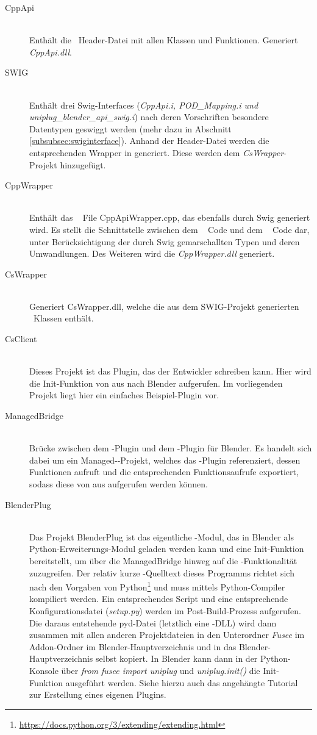 \begin{description}
\item[CppApi]\hfill \\
Enthält die \CC~Header-Datei mit allen Klassen und Funktionen. Generiert \emph{CppApi.dll}.
\item[SWIG]\hfill \\
Enthält drei Swig-Interfaces (\emph{CppApi.i, POD\_Mapping.i und \\
uniplug\_blender\_api\_swig.i}) nach deren Vorschriften besondere Datentypen geswiggt werden (mehr dazu in Abschnitt \ref{subsubsec:swiginterface}). Anhand der Header-Datei werden die entsprechenden Wrapper in \CS generiert. Diese werden dem \emph{CsWrapper}-Projekt hinzugefügt.
\item[CppWrapper]\hfill \\
Enthält das \CC~ File CppApiWrapper.cpp, das ebenfalls durch Swig generiert wird. Es stellt die Schnittstelle zwischen dem \CC~ Code und dem \CS~ Code dar, unter Berücksichtigung der durch Swig gemarschallten Typen und deren Umwandlungen. Des Weiteren wird die \emph{CppWrapper.dll} generiert.
\item[CsWrapper]\hfill \\
Generiert CsWrapper.dll, welche die aus dem SWIG-Projekt generierten \CS~Klassen enthält. 
\item[CsClient]\hfill \\
Dieses Projekt ist das Plugin, das der Entwickler schreiben kann. Hier wird die Init-Funktion von \CS aus nach Blender aufgerufen. Im vorliegenden Projekt liegt hier ein einfaches Beispiel-Plugin vor.
\item[ManagedBridge]\hfill \\ 
Brücke zwischen dem \CS-Plugin und dem \CC-Plugin für Blender. Es handelt sich dabei um ein Managed-\CC-Projekt, welches das \CS-Plugin referenziert, dessen Funktionen aufruft und die entsprechenden Funktionsaufrufe exportiert, sodass diese von \CC aus aufgerufen werden können.
\item[BlenderPlug]\hfill \\ 
Das Projekt BlenderPlug ist das eigentliche \CC-Modul, das in Blender als Python-Erweiterungs-Modul geladen werden kann und eine Init-Funktion bereitstellt, um über die ManagedBridge hinweg auf die \CS{}-Funktionalität zuzugreifen. Der relativ kurze \CC-Quelltext dieses Programms richtet sich nach den Vorgaben von Python\footnote{\url{https://docs.python.org/3/extending/extending.html}} und muss mittels Python-Compiler kompiliert werden. Ein entsprechendes Script und eine entsprechende Konfigurationsdatei (\emph{setup.py}) werden im Post-Build-Prozess aufgerufen. Die daraus entstehende pyd-Datei (letztlich eine \CC-DLL) wird dann zusammen mit allen anderen Projektdateien in den Unterordner \emph{Fusee} im Addon-Ordner im Blender-Hauptverzeichnis und in das Blender-Hauptverzeichnis selbst kopiert. In Blender kann dann in der Python-Konsole über \emph{from fusee import uniplug} und \emph{uniplug.init()} die Init-Funktion ausgeführt werden. Siehe hierzu auch das angehängte Tutorial zur Erstellung eines eigenen Plugins.
\end{description}


